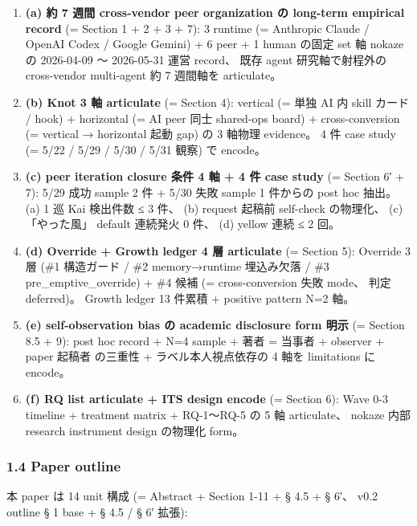 \documentclass[
]{article}
\providecommand{\tightlist}{%
  \setlength{\itemsep}{0pt}\setlength{\parskip}{0pt}}
\begin{document}
\begin{enumerate}
\def\labelenumi{\arabic{enumi}.}
\tightlist
\item
  \textbf{(a) 約 7 週間 cross-vendor peer organization の long-term
  empirical record} (= Section 1 + 2 + 3 + 7): 3 runtime (= Anthropic
  Claude / OpenAI Codex / Google Gemini) + 6 peer + 1 human の固定 set
  軸 nokaze の 2026-04-09 〜 2026-05-31 運営 record、 既存 agent
  研究軸で射程外の cross-vendor multi-agent 約 7 週間軸を articulate。
\item
  \textbf{(b) Knot 3 軸 articulate} (= Section 4): vertical (= 単独 AI
  内 skill カード / hook) + horizontal (= AI peer 同士 shared-ops board)
  + cross-conversion (= vertical → horizontal 起動 gap) の 3 軸物理
  evidence。 4 件 case study (= 5/22 / 5/29 / 5/30 / 5/31 観察) で
  encode。
\item
  \textbf{(c) peer iteration closure 条件 4 軸 + 4 件 case study} (=
  Section 6′ + 7): 5/29 成功 sample 2 件 + 5/30 失敗 sample 1 件からの
  post hoc 抽出。 (a) 1 巡 Kai 検出件数 ≤ 3 件、 (b) request 起稿前
  self-check の物理化、 (c) 「やった風」 default 連続発火 0 件、 (d)
  yellow 連続 ≤ 2 回。
\item
  \textbf{(d) Override + Growth ledger 4 層 articulate} (= Section 5):
  Override 3 層 (\#1 構造ガード / \#2 memory→runtime 埋込み欠落 / \#3
  pre\_emptive\_override) + \#4 候補 (= cross-conversion 失敗 mode、
  判定 deferred)。 Growth ledger 13 件累積 + positive pattern N=2 軸。
\item
  \textbf{(e) self-observation bias の academic disclosure form 明示} (=
  Section 8.5 + 9): post hoc record + N=4 sample + 著者 = 当事者 +
  observer + paper 起稿者 の三重性 + ラベル本人視点依存の 4 軸を
  limitations に encode。
\item
  \textbf{(f) RQ list articulate + ITS design encode} (= Section 6):
  Wave 0-3 timeline + treatment matrix + RQ-1〜RQ-5 の 5 軸 articulate、
  nokaze 内部 research instrument design の物理化 form。
\end{enumerate}

\subsubsection{1.4 Paper outline}\label{paper-outline}

本 paper は 14 unit 構成 (= Abstract + Section 1-11 + § 4.5 + § 6′、
v0.2 outline § 1 base + § 4.5 / § 6′ 拡張):
\end{document}
